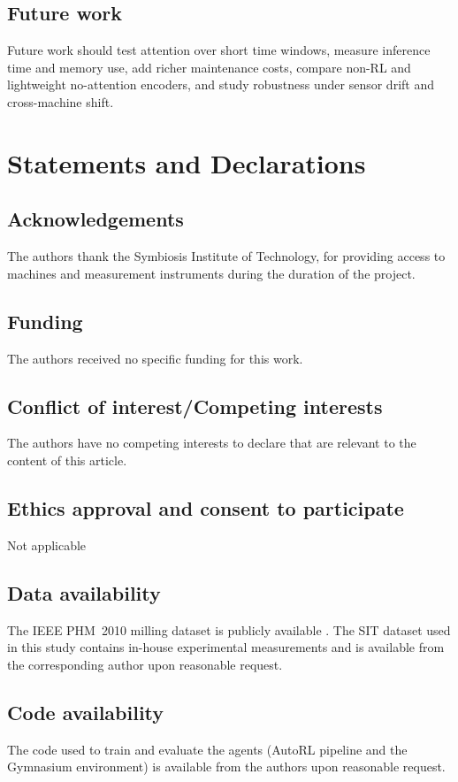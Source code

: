 \documentclass[sn-basic]{sn-jnl}%
\begin{document}
\subsection{Future work}
Future work should test attention over short time windows, measure inference time and memory use, add richer maintenance costs, compare non-RL and lightweight no-attention encoders, and study robustness under sensor drift and cross-machine shift.

\section*{Statements and Declarations}

\subsection*{Acknowledgements}
The authors thank the Symbiosis Institute of Technology, for providing access to machines and measurement instruments during the duration of the project.

\subsection*{Funding}
The authors received no specific funding for this work.

\subsection*{Conflict of interest/Competing interests}
The authors have no competing interests to declare that are relevant to the content of this article.

\subsection*{Ethics approval and consent to participate}
Not applicable

\subsection*{Data availability}
The IEEE PHM~2010 milling dataset is publicly available \cite{PHMdata2010}. The SIT dataset used in this study contains in-house experimental measurements and is available from the corresponding author upon reasonable request.

\subsection*{Code availability}
The code used to train and evaluate the agents (AutoRL pipeline and the Gymnasium environment) is available from the authors upon reasonable request.
\end{document}
